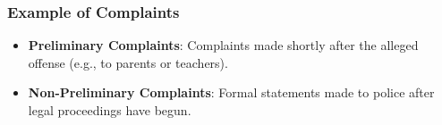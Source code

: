 \subsubsection{Example of Complaints}\label{example-of-complaints}

\begin{itemize}
\tightlist
\item
  \textbf{Preliminary Complaints}: Complaints made shortly after the
  alleged offense (e.g., to parents or teachers).
\item
  \textbf{Non-Preliminary Complaints}: Formal statements made to police
  after legal proceedings have begun.
\end{itemize}
